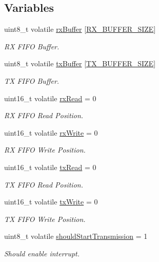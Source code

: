 \subsection*{Variables}
\begin{DoxyCompactItemize}
\item 
uint8\-\_\-t volatile \hyperlink{group__uart_ga8e77b30148ad1a3590ed6b1733ad0bfd}{rx\-Buffer} \mbox{[}\hyperlink{group__config_ga739a2a1a0047c98ac1b18ecd25dac092}{R\-X\-\_\-\-B\-U\-F\-F\-E\-R\-\_\-\-S\-I\-Z\-E}\mbox{]}
\begin{DoxyCompactList}\small\item\em R\-X F\-I\-F\-O Buffer. \end{DoxyCompactList}\item 
uint8\-\_\-t volatile \hyperlink{group__uart_gaca401a5697a6121045ed2ea5dd80001e}{tx\-Buffer} \mbox{[}\hyperlink{group__config_ga9ab33647617098646990fe263600b650}{T\-X\-\_\-\-B\-U\-F\-F\-E\-R\-\_\-\-S\-I\-Z\-E}\mbox{]}
\begin{DoxyCompactList}\small\item\em T\-X F\-I\-F\-O Buffer. \end{DoxyCompactList}\item 
uint16\-\_\-t volatile \hyperlink{group__uart_ga9ec81baf5fa44701fbe03f942171b5e6}{rx\-Read} = 0
\begin{DoxyCompactList}\small\item\em R\-X F\-I\-F\-O Read Position. \end{DoxyCompactList}\item 
uint16\-\_\-t volatile \hyperlink{group__uart_ga6428d84da0f4255131fef945c27af689}{rx\-Write} = 0
\begin{DoxyCompactList}\small\item\em R\-X F\-I\-F\-O Write Position. \end{DoxyCompactList}\item 
uint16\-\_\-t volatile \hyperlink{group__uart_gaa7d4cb17a7fc5817722bdd106b31f60b}{tx\-Read} = 0
\begin{DoxyCompactList}\small\item\em T\-X F\-I\-F\-O Read Position. \end{DoxyCompactList}\item 
uint16\-\_\-t volatile \hyperlink{group__uart_gaa0a6ae00e44b68a3250aec0f9599c262}{tx\-Write} = 0
\begin{DoxyCompactList}\small\item\em T\-X F\-I\-F\-O Write Position. \end{DoxyCompactList}\item 
uint8\-\_\-t volatile \hyperlink{group__uart_ga7f9fb8e4a004459dd017ce8383fa65ff}{should\-Start\-Transmission} = 1
\begin{DoxyCompactList}\small\item\em Should enable interrupt. \end{DoxyCompactList}\end{DoxyCompactItemize}



